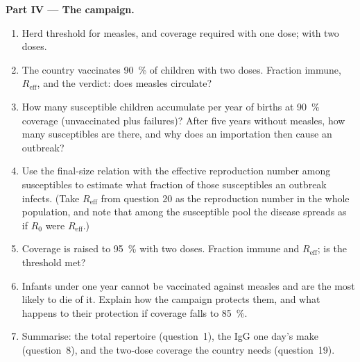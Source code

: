 \begin{problem}
\medskip
\noindent\textbf{Part IV --- The campaign.}
\begin{enumerate}[resume]
  \item Herd threshold for measles, and coverage required with one
        dose; with two doses.
  \item The country vaccinates \qty{90}{\%} of children with two doses.
        Fraction immune, $R_{\text{eff}}$, and the verdict: does measles
        circulate?
  \item How many susceptible children accumulate per year of births at
        \qty{90}{\%} coverage (unvaccinated plus  failures)? After
        five years without measles, how many susceptibles are there,
        and why does an importation then cause an outbreak?
  \item Use the final-size relation with the effective reproduction
        number among susceptibles to estimate what fraction of those
        susceptibles an outbreak infects. (Take $R_{\text{eff}}$ from
        question 20 as the reproduction number in the whole population,
        and note that among the susceptible pool the disease spreads
        as if $R_{0}$ were $R_{\text{eff}}$.)
  \item Coverage is raised to \qty{95}{\%} with two doses. Fraction
        immune and $R_{\text{eff}}$; is the threshold met?
  \item Infants under one year cannot be vaccinated against measles
        and are the most likely to die of it. Explain how the campaign
        protects them, and what happens to their protection if coverage
        falls to \qty{85}{\%}.
  \item Summarise: the total repertoire (question~1), the IgG one day's
         make (question~8), and the two-dose coverage the
        country needs (question~19).
\end{enumerate}
\end{problem}
